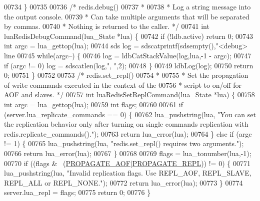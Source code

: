 \begin{DoxyCode}
{{{{{{{00734 \}
00735 
00736 \textcolor{comment}{/* redis.debug()}
00737 \textcolor{comment}{ *}
00738 \textcolor{comment}{ * Log a string message into the output console.}
00739 \textcolor{comment}{ * Can take multiple arguments that will be separated by commas.}
00740 \textcolor{comment}{ * Nothing is returned to the caller. */}
00741 \textcolor{keywordtype}{int} luaRedisDebugCommand(lua\_State *lua) \{
00742     \textcolor{keywordflow}{if} (!ldb.active) \textcolor{keywordflow}{return} 0;
00743     \textcolor{keywordtype}{int} argc = lua\_gettop(lua);
00744     sds log = sdscatprintf(sdsempty(),\textcolor{stringliteral}{"<debug> line %
00745     \textcolor{keywordflow}{while}(argc--) \{
00746         log = ldbCatStackValue(log,lua,-1 - argc);
00747         \textcolor{keywordflow}{if} (argc != 0) log = sdscatlen(log,\textcolor{stringliteral}{", "},2);
00748     \}
00749     ldbLog(log);
00750     \textcolor{keywordflow}{return} 0;
00751 \}
00752 
00753 \textcolor{comment}{/* redis.set\_repl()}
00754 \textcolor{comment}{ *}
00755 \textcolor{comment}{ * Set the propagation of write commands executed in the context of the}
00756 \textcolor{comment}{ * script to on/off for AOF and slaves. */}
00757 \textcolor{keywordtype}{int} luaRedisSetReplCommand(lua\_State *lua) \{
00758     \textcolor{keywordtype}{int} argc = lua\_gettop(lua);
00759     \textcolor{keywordtype}{int} flags;
00760 
00761     \textcolor{keywordflow}{if} (server.lua\_replicate\_commands == 0) \{
00762         lua\_pushstring(lua, \textcolor{stringliteral}{"You can set the replication behavior only after turning on single
       commands replication with redis.replicate\_commands()."});
00763         \textcolor{keywordflow}{return} lua\_error(lua);
00764     \} \textcolor{keywordflow}{else} \textcolor{keywordflow}{if} (argc != 1) \{
00765         lua\_pushstring(lua, \textcolor{stringliteral}{"redis.set\_repl() requires two arguments."});
00766         \textcolor{keywordflow}{return} lua\_error(lua);
00767     \}
00768 
00769     flags = lua\_tonumber(lua,-1);
00770     \textcolor{keywordflow}{if} ((flags & ~(\hyperlink{server_8h_a542fb79924ca427c866fd63632f60777}{PROPAGATE\_AOF}|\hyperlink{server_8h_a59c6e025b4ed85642a0472fc3e73e298}{PROPAGATE\_REPL})) != 0) \{
00771         lua\_pushstring(lua, \textcolor{stringliteral}{"Invalid replication flags. Use REPL\_AOF, REPL\_SLAVE, REPL\_ALL or
       REPL\_NONE."});
00772         \textcolor{keywordflow}{return} lua\_error(lua);
00773     \}
00774     server.lua\_repl = flags;
00775     \textcolor{keywordflow}{return} 0;
00776 \}
}}}}}}}}
\end{DoxyCode}
